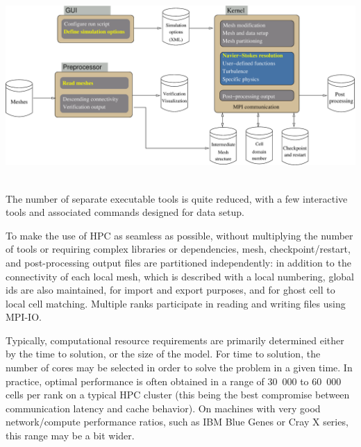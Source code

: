 \vspace{+0.40in}
\includegraphics[scale=0.2]{pictures/cs_components.eps}
\label{fig:cs_components}
\vspace{+0.04in}
~\

The number of separate executable tools is quite reduced, with a few
interactive tools and associated commands designed for data setup.

To make the use of HPC as seamless as possible, without multiplying the
number of tools or requiring complex libraries or dependencies,
mesh, checkpoint/restart, and post-processing output files
are partitioned independently: in addition to the connectivity of each
local mesh, which is described with a local numbering, global ids are also
maintained, for import and export purposes, and for ghost cell to
local cell matching. Multiple ranks participate in reading and writing
files using MPI-IO.

Typically, computational resource requirements are primarily determined
either by the time to solution, or the size of the model. For time to
solution, the number of cores may be selected in order to solve the problem
in a given time. In practice, optimal performance is often obtained
in a range of 30~000 to 60~000 cells per rank on a typical HPC cluster
(this being the best compromise between communication latency and
cache behavior). On machines with very good network/compute performance
ratios, such as IBM Blue Genes or Cray X series, this range may be
a bit wider.
